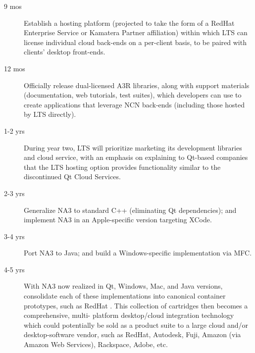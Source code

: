 \begin{frame}{}
\hspace{20pt}\begin{minipage}{.995\textwidth}
{\LARGE {}\selectfont \setlength{\leftmargini}{3pt}\begin{description}
\item[9 mos] Establish a hosting platform 
(projected to take the form of a 
RedHat Enterprise Service or Kamatera Partner affiliation) within which 
LTS can license individual cloud back-ends 
on a per-client basis, to be paired with 
clients' desktop front-ends. 
\item[12 mos] Officially release dual-licensed 
A3R libraries, along with support materials 
(documentation, web tutorials, test suites), 
which developers can use to create applications 
that leverage 
NCN back-ends (including those hosted by 
LTS directly).
\item[1-2 yrs] During year two, 
LTS will prioritize marketing its development libraries 
and cloud service, 
with an emphasis on explaining to Qt-based 
companies that the LTS hosting option provides 
functionality similar to the discontinued 
Qt Cloud Services.   
\item[2-3 yrs] Generalize NA3 to standard 
C++ (eliminating Qt dependencies); and 
implement NA3 in an Apple-specific version 
targeting XCode.  
\item[3-4 yrs] Port NA3 to Java; and 
build a Windows-specific implementation 
via MFC.
\item[4-5 yrs] With NA3 now realized 
in Qt, Windows, Mac, and Java versions, 
consolidate each of these implementations 
into canonical container prototypes, 
such as RedHat .  This 
collection of cartridges then becomes 
a comprehensive, multi- platform 
desktop/cloud integration technology 
which could potentially be sold as a 
product suite to a large cloud and/or 
desktop-software vendor, such as  
RedHat, Autodesk, Fuji, Amazon 
(via Amazon Web Services), Rackspace, Adobe, etc.  
\end{description}}\end{minipage}


\end{frame}
